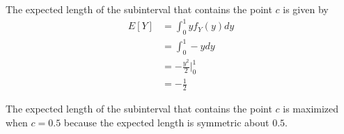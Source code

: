 The expected length of the subinterval that contains the point \( c \) is given by
\begin{align*}
    E[Y] & = \int_{0}^{1} y f_{Y}(y) dy     \\
         & = \int_{0}^{1} -y dy             \\
         & = -\frac{y^{2}}{2} \Big|_{0}^{1} \\
         & = -\frac{1}{2}
\end{align*}

The expected length of the subinterval that contains the point \( c \) is maximized when \( c = 0.5 \) because the expected length is symmetric about \( 0.5 \).
